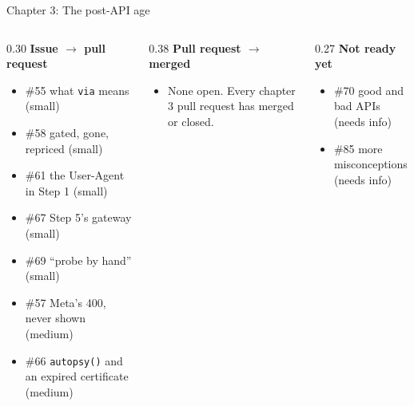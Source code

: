 \documentclass[9pt,aspectratio=169]{beamer}
\begin{document}
\begin{frame}{Chapter 3: The post-API age}
    \begin{columns}[T]
        \begin{column}{0.30\textwidth}
            \textbf{Issue $\to$ pull request}
            \begin{itemize}\small
                \item \#55 what \texttt{via} means (small)
                \item \#58 gated, gone, repriced (small)
                \item \#61 the User-Agent in Step 1 (small)
                \item \#67 Step 5's gateway (small)
                \item \#69 ``probe by hand'' (small)
                \item \#57 Meta's 400, never shown (medium)
                \item \#66 \texttt{autopsy()} and an expired certificate (medium)
            \end{itemize}
        \end{column}
        \begin{column}{0.38\textwidth}
            \textbf{Pull request $\to$ merged}
            \begin{itemize}\small
                \item None open. Every chapter 3 pull request has merged or closed.
            \end{itemize}
        \end{column}
        \begin{column}{0.27\textwidth}
            \textbf{Not ready yet}
            \begin{itemize}\small
                \item \#70 good and bad APIs (needs info)
                \item \#85 more misconceptions (needs info)
            \end{itemize}
        \end{column}
    \end{columns}
\end{frame}
\end{document}
